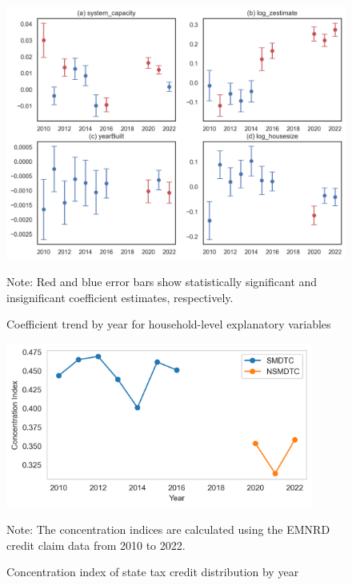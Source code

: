 \documentclass[11pt,twoside,letterpaper]{article}
\begin{document}
\begin{figure}[H]
    \centering
\includegraphics[width=1\textwidth]{figures/key_coefficient_trend.png}
    \caption{Coefficient trend by year for household-level explanatory variables}
    \label{fig:coefficient_trend}
      \begin{flushleft}
        \footnotesize Note: Red and blue error bars show statistically significant and insignificant coefficient estimates, respectively.
    \end{flushleft}
\end{figure}

\begin{figure}[H]
    \centering
\includegraphics[width=0.9\textwidth]{figures/concentration_index_by_year.png}
    \caption{Concentration index of state tax credit distribution by year}
    \label{fig:concentration_index}
          \begin{flushleft}
        \footnotesize Note: The concentration indices are calculated using the EMNRD credit claim data from 2010 to 2022.  
    \end{flushleft}
\end{figure}
\end{document}
